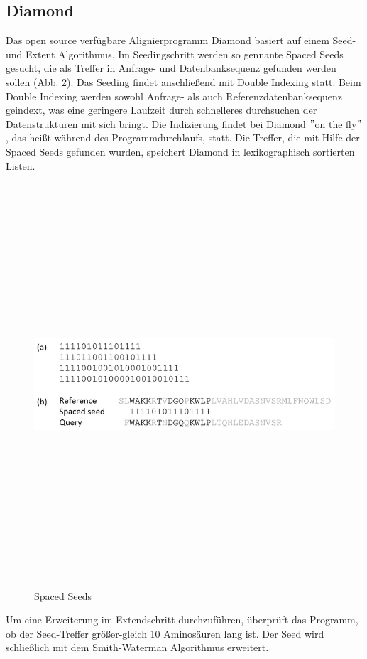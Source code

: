 \documentclass[10pt, a4paper]{article}[08.12.2015]
\begin{document}
\newline    
    
    \subsection{\textrm{Diamond}}    
    Das open source verf\"ugbare Alignierprogramm Diamond \cite{buchfink2014} basiert auf einem Seed- und Extent Algorithmus. Im Seedingschritt werden so gennante Spaced Seeds gesucht, die als Treffer in Anfrage- und Datenbanksequenz gefunden werden sollen (Abb. 2). Das Seeding findet anschlie{\ss}end mit Double Indexing statt. Beim Double Indexing werden sowohl Anfrage- als auch Referenzdatenbanksequenz geindext, was eine geringere Laufzeit durch schnelleres durchsuchen der Datenstrukturen mit sich bringt. Die Indizierung findet bei Diamond $"$on the fly$"$, das hei{\ss}t w\"ahrend des Programmdurchlaufs, statt. Die Treffer, die mit Hilfe der Spaced Seeds gefunden wurden, speichert Diamond in lexikographisch sortierten Listen.
\begin{figure}[h]
\centering
      \noindent\includegraphics[width=\linewidth,height=15cm,
      keepaspectratio]{Abbildungen/diamond_spacedSeeds.jpg}
      \caption{Spaced Seeds}
\end{figure}
\newline
    Um eine Erweiterung im Extendschritt durchzuf\"uhren, \"uberpr\"uft das Programm, ob der Seed-Treffer gr\"o{\ss}er-gleich 10 Aminos\"auren lang ist. Der Seed wird schlie{\ss}lich mit dem Smith-Waterman Algorithmus erweitert.
\newline
    
\end{document}
